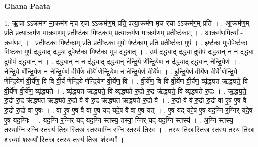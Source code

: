 \documentclass[17pt]{extarticle}
\begin{document}
\textbf{Ghana Paata } \newline

1. ऋ॒चा ऽऽक्रम॑ण मा॒क्रम॑ण मृ॒च र्‌चा ऽऽक्रम॑ण॒म् प्रति॒ प्रत्या॒क्रम॑ण मृ॒च र्‌चा ऽऽक्रम॑ण॒म् प्रति॑ । . आ॒क्रम॑ण॒म् प्रति॒ प्रत्या॒क्रम॑ण मा॒क्रम॑ण॒म् प्रतीष्ट॑का॒ मिष्ट॑का॒म् प्रत्या॒क्रम॑ण मा॒क्रम॑ण॒म् प्रतीष्ट॑काम् । . आ॒क्रम॑ण॒मित्या᳚ - क्रम॑णम् । . प्रतीष्ट॑का॒ मिष्ट॑का॒म् प्रति॒ प्रतीष्ट॑का॒ मुपो पेष्ट॑का॒म् प्रति॒ प्रतीष्ट॑का॒ मुप॑ । . इष्ट॑का॒ मुपोपेष्ट॑का॒ मिष्ट॑का॒ मुप॑ दद्ध्याद् दद्ध्या॒ दुपेष्ट॑का॒ मिष्ट॑का॒ मुप॑ दद्ध्यात् । . उप॑ दद्ध्याद् दद्ध्या॒ दुपोप॑ दद्ध्या॒न् न न द॑द्ध्या॒ दुपोप॑ दद्ध्या॒न् न । . द॒द्ध्या॒न् न न द॑द्ध्याद् दद्ध्या॒न् नेन्द्रि॒ये णे᳚न्द्रि॒येण॒ न द॑द्ध्याद् दद्ध्या॒न् नेन्द्रि॒येण॑ । . नेन्द्रि॒ये णे᳚न्द्रि॒येण॒ न नेन्द्रि॒येण॑ वी॒र्ये॑ण वी॒र्ये॑ णेन्द्रि॒येण॒ न नेन्द्रि॒येण॑ वी॒र्ये॑ण । . इ॒न्द्रि॒येण॑ वी॒र्ये॑ण वी॒र्ये॑ णेन्द्रि॒ये णे᳚न्द्रि॒येण॑ वी॒र्ये॑ण॒ वि वि वी॒र्ये॑ णेन्द्रि॒ये णे᳚न्द्रि॒येण॑ वी॒र्ये॑ण॒ वि । . वी॒र्ये॑ण॒ वि वि वी॒र्ये॑ण वी॒र्ये॑ण॒ व्यृ॑द्ध्यत ऋद्ध्यते॒ वि वी॒र्ये॑ण वी॒र्ये॑ण॒ व्यृ॑द्ध्यते । . व्यृ॑द्ध्यत ऋद्ध्यते॒ वि व्यृ॑द्ध्यते रु॒द्रो रु॒द्र ऋ॑द्ध्यते॒ वि व्यृ॑द्ध्यते रु॒द्रः । . ऋ॒द्ध्य॒ते॒ रु॒द्रो रु॒द्र ऋ॑द्ध्यत ऋद्ध्यते रु॒द्रो वै वै रु॒द्र ऋ॑द्ध्यत ऋद्ध्यते रु॒द्रो वै । . रु॒द्रो वै वै रु॒द्रो रु॒द्रो वा ए॒ष ए॒ष वै रु॒द्रो रु॒द्रो वा ए॒षः । . वा ए॒ष ए॒ष वै वा ए॒ष यद् यदे॒ष वै वा ए॒ष यत् । . ए॒ष यद् यदे॒ष ए॒ष यद॒ग्नि र॒ग्निर् यदे॒ष ए॒ष यद॒ग्निः । . यद॒ग्नि र॒ग्निर् यद् यद॒ग्नि स्तस्य॒ तस्या॒ ग्निर् यद् यद॒ग्नि स्तस्य॑ । . अ॒ग्नि स्तस्य॒ तस्या॒ग्नि र॒ग्नि स्तस्य॑ ति॒स्र स्ति॒स्र स्तस्या॒ग्नि र॒ग्नि स्तस्य॑ ति॒स्रः । . तस्य॑ ति॒स्र स्ति॒स्र स्तस्य॒ तस्य॑ ति॒स्रः श॑र॒व्याः᳚ शर॒व्या᳚ स्ति॒स्र स्तस्य॒ तस्य॑ ति॒स्रः श॑र॒व्याः᳚ । \newline
\end{document}
